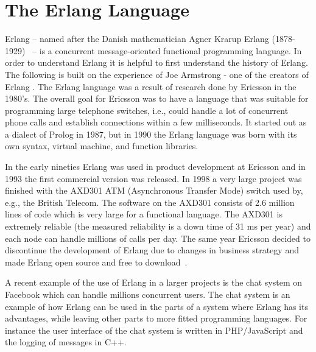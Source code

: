 \section{The Erlang Language}
\label{sec:erlang}
Erlang -- named after the Danish mathematician Agner Krarup Erlang (1878-1929)~\cite{RefWorks:76} -- is a concurrent message-oriented functional programming language. In order to understand Erlang it is helpful to first understand the history of Erlang. The following is built on the experience of Joe Armstrong - one of the creators of Erlang \cite{RefWorks:75}. The Erlang language was a result of research done by Ericsson in the 1980's. The overall goal for Ericsson was to have a language that was suitable for programming large telephone switches, i.e., could handle a lot of concurrent phone calls and establish connections within a few milliseconds. It started out as a dialect of Prolog in 1987, but in 1990 the Erlang language was born with its own syntax, virtual machine, and function libraries.

In the early nineties Erlang was used in product development at Ericsson and in 1993 the first commercial version was released. In 1998 a very large project was finished with the AXD301 ATM (Asynchronous Transfer Mode) switch used by, e.g., the British Telecom. The software on the AXD301 consists of 2.6 million lines of code which is very large for a functional language. The AXD301 is extremely reliable (the measured reliability is a down time of 31 ms per year) and each node can handle millions of calls per day. The same year Ericsson decided to discontinue the development of Erlang due to changes in business strategy and made Erlang open source and free to download~\cite{RefWorks:76}. 

A recent example of the use of Erlang in a larger projects is the chat system on Facebook \cite{Facebook,RefWorks:81} which can handle millions concurrent users. The chat system is an example of how Erlang can be used in the parts of a system where Erlang has its advantages, while leaving other parts to more fitted programming languages. For instance the user interface of the chat system is written in PHP/JavaScript and the logging of messages in C++. 




